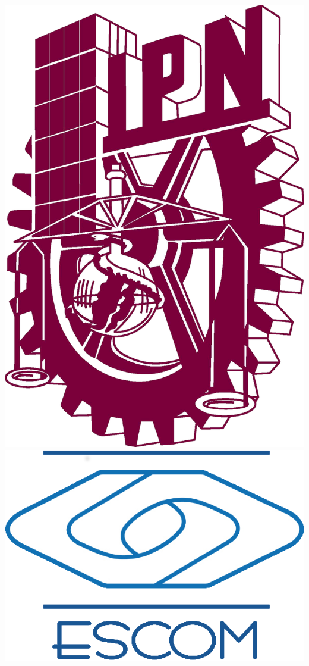 \thispagestyle{empty}
\begin{center}  
  \includegraphics[height=0.16\textheight]{./image/title-page/IPN.png}
  \hspace*{0.5\textwidth}
	\includegraphics[height=0.15\textheight]{./image/title-page/ESCOM.png}
	

\end{center}

